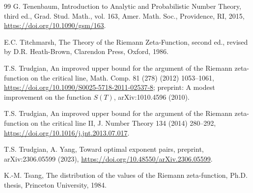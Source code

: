 \documentclass[preprint,12pt]{elsarticle}
\numberwithin{equation}{section}
\theoremstyle{plain}
\theoremstyle{definition}
\theoremstyle{remark}
\begin{document}
\begin{thebibliography}{99}
G. Tenenbaum, Introduction to Analytic and Probabilistic Number Theory, third ed., Grad. Stud. Math., vol. 163, Amer. Math. Soc., Providence, RI, 2015, \href{https://doi.org/10.1090/gsm/163}{https://doi.org/10.1090/gsm/163}.

E.C. Titchmarsh, The Theory of the Riemann Zeta-Function, second ed., revised by D.R. Heath-Brown, Clarendon Press, Oxford, 1986.

T.S. Trudgian, An improved upper bound for the argument of the Riemann zeta-function on the critical line, Math. Comp. 81 (278) (2012) 1053--1061, \href{https://doi.org/10.1090/S0025-5718-2011-02537-8}{https://doi.org/10.1090/S0025-5718-2011-02537-8}; preprint: A modest improvement on the function $S(T)$, arXiv:1010.4596 (2010).

T.S. Trudgian, An improved upper bound for the argument of the Riemann zeta-function on the critical line II, J. Number Theory 134 (2014) 280--292, \href{https://doi.org/10.1016/j.jnt.2013.07.017}{https://doi.org/10.1016/j.jnt.2013.07.017}.

T.S. Trudgian, A. Yang, Toward optimal exponent pairs, preprint, arXiv:2306.05599 (2023), \href{https://doi.org/10.48550/arXiv.2306.05599}{https://doi.org/10.48550/arXiv.2306.05599}.

K.-M. Tsang, The distribution of the values of the Riemann zeta-function, Ph.D. thesis, Princeton University, 1984.

\end{thebibliography}
\end{document}
